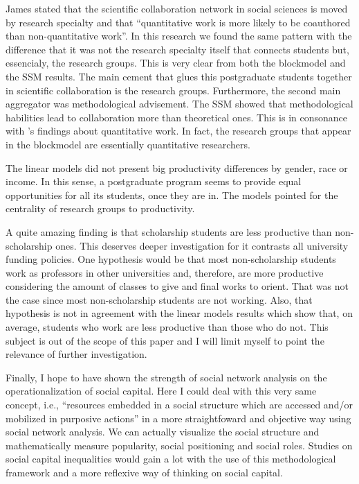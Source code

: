 \documentclass[12pt, english]{article}
\begin{document}
James \cite[p. 213]{moody2004structure} stated that the scientific collaboration network in social sciences is moved by research specialty and that ``quantitative work is more likely to be coauthored than non-quantitative work''. In this research we found the same pattern with the difference that it was not the research specialty itself that connects students but, essencialy, the research groups. This is very clear from both the blockmodel and the SSM results. The main cement that glues this postgraduate students together in scientific collaboration is the research groups. Furthermore, the second main aggregator was methodological advisement. The SSM showed that methodological habilities lead to collaboration more than theoretical ones. This is in consonance with \cite{moody2004structure}'s findings about quantitative work. In fact, the research groups that appear in the blockmodel are essentially quantitative researchers.

The linear models did not present big productivity differences by gender, race or income. In this sense, a postgraduate program seems to provide equal opportunities for all its students, once they are in. The models pointed for the centrality of research groups to productivity.

A quite amazing finding is that scholarship students are less productive than non-scholarship ones. This deserves deeper investigation for it contrasts all university funding policies. One hypothesis would be that most non-scholarship students work as professors in other universities and, therefore, are more productive considering the amount of classes to give and final works to orient. That was not the case since most non-scholarship students are not working. Also, that hypothesis is not in agreement with the linear models results which show that, on average, students who work are less productive than those who do not. This subject is out of the scope of this paper and I will limit myself to point the relevance of further investigation.

Finally, I hope to have shown the strength of social network analysis on the operationalization of social capital. Here I could deal with this very same concept, i.e., ``resources embedded in a social structure which are accessed and/or mobilized in purposive actions'' \cite[p. 35]{lin1999building} in a more straightfoward and objective way using social network analysis. We can actually visualize the social structure and mathematically measure popularity, social positioning and social roles. Studies on social capital inequalities would gain a lot with the use of this methodological framework and a more reflexive way of thinking on social capital.



\end{document}
